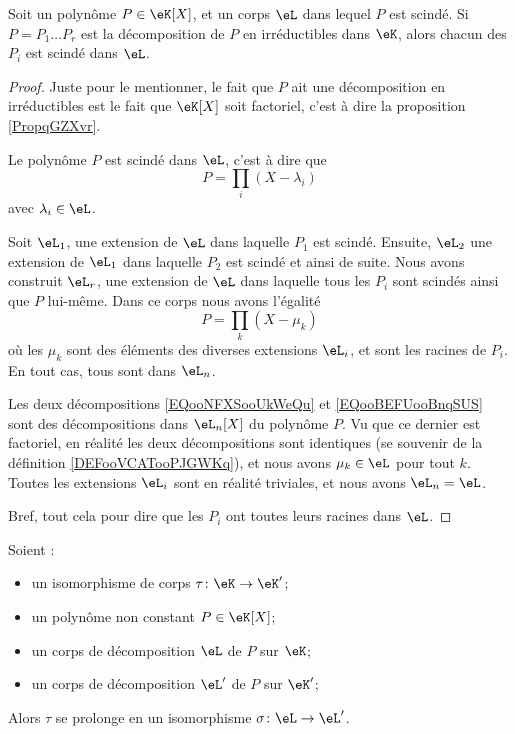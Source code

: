 \begin{lemma}        \label{LEMooJNGWooTXdGre}
    Soit un polynôme \( P\in \eK[X]\), et un corps \( \eL\) dans lequel \( P\) est scindé. Si \( P=P_1\ldots P_r\) est la décomposition de \( P\) en irréductibles dans \( \eK\), alors chacun des \( P_i\) est scindé dans \( \eL\).
\end{lemma}

\begin{proof}
    Juste pour le mentionner, le fait que \( P\) ait une décomposition en irréductibles est le fait que \( \eK[X]\) soit factoriel, c'est à dire la proposition \ref{PropqGZXvr}.

    Le polynôme \( P\) est scindé dans \( \eL\), c'est à dire que 
    \begin{equation}        \label{EQooNFXSooUkWeQu}
        P=\prod_{i}(X-\lambda_i)
    \end{equation}
    avec \( \lambda_i\in \eL\).

    Soit \( \eL_1\), une extension de \( \eL\) dans laquelle \( P_1\) est scindé. Ensuite, \( \eL_2\) une extension de \( \eL_1\) dans laquelle \( P_2\) est scindé et ainsi de suite. Nous avons construit \( \eL_r\), une extension de \( \eL\) dans laquelle tous les \( P_i\) sont scindés ainsi que \( P\) lui-même. Dans ce corps nous avons l'égalité
    \begin{equation}        \label{EQooBEFUooBnqSUS}
        P=\prod_k(X-\mu_k)
    \end{equation}
    où les \( \mu_k\) sont des éléments des diverses extensions \( \eL_i\), et sont les racines de \( P_i\). En tout cas, tous sont dans \( \eL_n\).

    Les deux décompositions \eqref{EQooNFXSooUkWeQu} et \eqref{EQooBEFUooBnqSUS} sont des décompositions dans \( \eL_n[X]\) du polynôme \( P\). Vu que ce dernier est factoriel, en réalité les deux décompositions sont identiques (se souvenir de la définition \ref{DEFooVCATooPJGWKq}), et nous avons \( \mu_k\in \eL\) pour tout \( k\). Toutes les extensions \( \eL_i\) sont en réalité triviales, et nous avons \( \eL_n=\eL\).

    Bref, tout cela pour dire que les \( P_i\) ont toutes leurs racines dans \( \eL\).
\end{proof}

\begin{theorem}      \label{THOooQVKWooZAAYxK}
    Soient :
    \begin{itemize}
        \item un isomorphisme de corps \( \tau\colon \eK\to \eK'\);
        \item un polynôme non constant \( P\in \eK[X]\);
        \item un corps de décomposition \( \eL\) de \( P\) sur \( \eK\);
        \item un corps de décomposition \( \eL'\) de \( P\) sur \( \eK'\);
    \end{itemize}
    Alors \( \tau\) se prolonge en un isomorphisme \( \sigma\colon \eL\to \eL'\).
\end{theorem}


